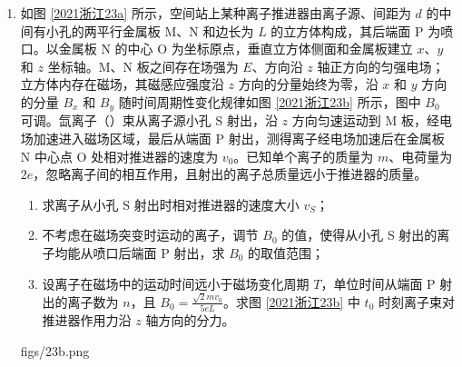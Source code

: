 \documentclass[\gkver]{gaokaozhenti}
\begin{document}
\begin{enumerate}
{	

	（4）考虑自感的情况下，线框会产生自感电动势阻碍电流的增加，因此电流是缓慢增加的，过一段时间电路达到稳定后自感消失，电流的峰值和之前大小相同，在 $1.0\times10^{-3}\Us\sim5.0\times10^{-3}\Us$ 时间内电路中的磁通量不变化电流要减小为零，因此自感电动势会阻碍电流的减小，使得电流缓慢减小为零，电流图像如图

}

\item
如图 \ref{2021浙江23a} 所示，空间站上某种离子推进器由离子源、间距为 $d$ 的中间有小孔的两平行金属板 M、N 和边长为 $L$ 的立方体构成，其后端面 P 为喷口。以金属板 N 的中心 O 为坐标原点，垂直立方体侧面和金属板建立 $x$、$y$ 和 $z$ 坐标轴。M、N 板之间存在场强为 $E$、方向沿 $z$ 轴正方向的匀强电场；立方体内存在磁场，其磁感应强度沿 $z$ 方向的分量始终为零，沿 $x$ 和 $y$ 方向的分量 $B_x$ 和 $B_y$ 随时间周期性变化规律如图 \ref{2021浙江23b} 所示，图中 $B_0$ 可调。氙离子（）束从离子源小孔 S 射出，沿 $z$ 方向匀速运动到 M 板，经电场加速进入磁场区域，最后从端面 P 射出，测得离子经电场加速后在金属板 N 中心点 O 处相对推进器的速度为 $v_0$。已知单个离子的质量为 $m$、电荷量为 $2e$，忽略离子间的相互作用，且射出的离子总质量远小于推进器的质量。

\begin{enumerate}
	\item
	求离子从小孔 S 射出时相对推进器的速度大小 $v_S$；
	\item
	不考虑在磁场突变时运动的离子，调节 $B_0$ 的值，使得从小孔 S 射出的离子均能从喷口后端面 P 射出，求 $B_0$ 的取值范围；
	\item
	设离子在磁场中的运动时间远小于磁场变化周期 $T$，单位时间从端面 P 射出的离子数为 $n$，且 $B_0=\frac{\sqrt 2 mv_0}{5eL}$。求图 \ref{2021浙江23b} 中 $t_0$ 时刻离子束对推进器作用力沿 $z$ 轴方向的分力。
\end{enumerate}

{figs/23b.png}

\end{enumerate}
\end{document}
